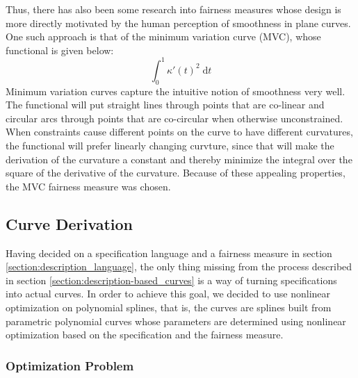 \documentclass[a4paper]{article}
\newcommand{\apply}[2]{#1\!\left(#2\right)}
\begin{document}
				Thus, there has also been some research into fairness measures whose design is more directly motivated by the human perception of smoothness in plane curves. One such approach is that of the minimum variation curve (MVC), whose functional is given below:
				\begin{equation*}
					\int_{0}^{1}\apply{\kappa'}{t}^2\;\mathrm{d}t
				\end{equation*}
				Minimum variation curves capture the intuitive notion of smoothness very well. The functional will put straight lines through points that are co-linear and circular arcs through points that are co-circular when otherwise unconstrained. When constraints cause different points on the curve to have different curvatures, the functional will prefer linearly changing curvture, since that will make the derivation of the curvature a constant and thereby minimize the integral over the square of the derivative of the curvature. Because of these appealing properties, the MVC fairness measure was chosen.

		\subsection{Curve Derivation}
		\label{section:curve_derivation}

			Having decided on a specification language and a fairness measure in section \ref{section:description_language}, the only thing missing from the process described in section \ref{section:description-based_curves} is a way of turning specifications into actual curves. In order to achieve this goal, we decided to use nonlinear optimization on polynomial splines, that is, the curves are splines built from parametric polynomial curves whose parameters are determined using nonlinear optimization based on the specification and the fairness measure.

			\subsubsection{Optimization Problem}
			\label{section:optimization_problem}
\end{document}

